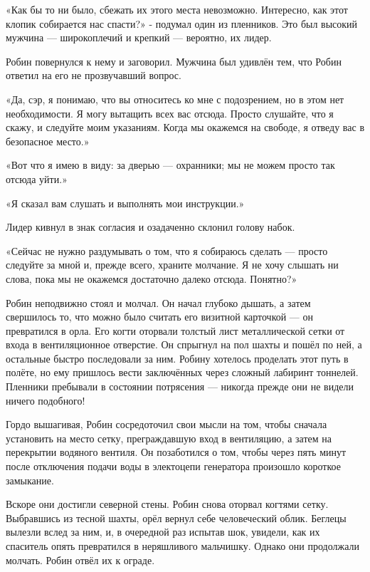 \documentclass[a4paper,12pt]{book}
\begin{document}
\par
«Как бы то ни было, сбежать их этого места невозможно. Интересно, как этот клопик собирается нас спасти?» - подумал один из пленников. Это был высокий мужчина — широкоплечий и крепкий — вероятно, их лидер.
\par
Робин повернулся к нему и заговорил. Мужчина был удивлён тем, что Робин ответил на его не прозвучавший вопрос.
\par
«Да, сэр, я понимаю, что вы относитесь ко мне с подозрением, но в этом нет необходимости. Я могу вытащить всех вас отсюда. Просто слушайте, что я скажу, и следуйте моим указаниям. Когда мы окажемся на свободе, я отведу вас в безопасное место.»
\par
«Вот что я имею в виду: за дверью — охранники; мы не можем просто так отсюда уйти.»
\par
«Я сказал вам слушать и выполнять мои инструкции.»
\par
Лидер кивнул в знак согласия и озадаченно склонил голову набок.
\par
«Сейчас не нужно раздумывать о том, что я собираюсь сделать — просто следуйте за мной и, прежде всего, храните молчание. Я не хочу слышать ни слова, пока мы не окажемся достаточно далеко отсюда. Понятно?»\\
\par
Робин неподвижно стоял и молчал. Он начал глубоко дышать, а затем свершилось то, что можно было считать его визитной карточкой — он превратился в орла. Его когти оторвали толстый лист металлической сетки от входа в вентиляционное отверстие. Он спрыгнул на пол шахты и пошёл по ней, а остальные быстро последовали за ним. Робину хотелось проделать этот путь в полёте, но ему пришлось вести заключённых через сложный лабиринт тоннелей. Пленники пребывали в состоянии потрясения — никогда прежде они не видели ничего подобного!
\par
Гордо вышагивая, Робин сосредоточил свои мысли на том, чтобы сначала установить на место сетку, преграждавшую вход в вентиляцию, а затем на перекрытии водяного вентиля. Он позаботился о том, чтобы через пять минут после отключения подачи воды в электоцепи генератора произошло короткое замыкание.
\par
Вскоре они достигли северной стены. Робин снова оторвал когтями сетку. Выбравшись из тесной шахты, орёл вернул себе человеческий облик. Беглецы вылезли вслед за ним, и, в очередной раз испытав шок, увидели, как их спаситель опять превратился в неряшливого мальчишку. Однако они продолжали молчать. Робин отвёл их к ограде.
\end{document}
